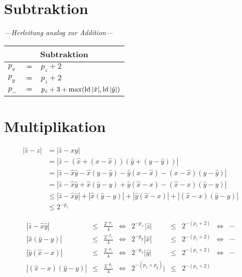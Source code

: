 \section{Subtraktion}

{\em ---Herleitung analog zur Addition---}

\begin{algorithm}
\phantom{}
\begin{center}
\renewcommand*{\arraystretch}{1.3}
\begin{tabular}{lcl}
  \hline
  \multicolumn{3}{c}{Subtraktion} \\
  \hline
   $p_x$ & $\defeq$ & $p_z+2$ \\
   $p_y$ & $\defeq$ & $p_z+2$ \\
   $p_-$ & $\defeq$ & $p_z+3+\max(\mathop{\rm ld}\nolimits|\hat{x}|,\mathop{\rm ld}\nolimits|\hat{y}|)$ \\
  \hline
\end{tabular}
\end{center}
\end{algorithm}



\pagebreak
\section{Multiplikation}

\begin{equation*}
\begin{split}
  |\hat{z}-z| & =  |\hat{z}-xy| \\
              & =  |\hat{z}-(\hat{x}+(x-\hat{x}))(\hat{y}+(y-\hat{y}))| \\
              & =  |\hat{z}-\hat{x}\hat{y}-\hat{x}(y-\hat{y})-\hat{y}(x-\hat{x})-(x-\hat{x})(y-\hat{y})| \\
              & =  |\hat{z}-\hat{x}\hat{y}+\hat{x}(\hat{y}-y)+\hat{y}(\hat{x}-x)-(\hat{x}-x)(\hat{y}-y)| \\
              &\le |\hat{z}-\hat{x}\hat{y}|+|\hat{x}(\hat{y}-y)|+|\hat{y}(\hat{x}-x)|+|(\hat{x}-x)(\hat{y}-y)| \\
              &\le 2^{-p_z}
\end{split}
\end{equation*}

\begin{equation*}
\begin{split}
  |\hat{z}-\hat{x}\hat{y}| & \le & \frac{2^{-p_z}}{4}
  & \Leftrightarrow & 
  2^{-{p_\times}}|\hat{z}| & \le & 2^{-(p_z+2)}
  & \Leftrightarrow & 
  \cdots
  \\
  |\hat{x}(\hat{y}-y)| & \le & \frac{2^{-p_z}}{4}
  & \Leftrightarrow & 
  2^{-p_y}|\hat{x}|  & \le & 2^{-(p_z+2)}
  & \Leftrightarrow & 
  \cdots
  \\
  |\hat{y}(\hat{x}-x)| & \le & \frac{2^{-p_z}}{4}
  & \Leftrightarrow & 
  2^{-p_x}|\hat{y}|  & \le & 2^{-(p_z+2)}
  & \Leftrightarrow & 
  \cdots
  \\
  |(\hat{x}-x)(\hat{y}-y)| & \le & \frac{2^{-p_z}}{4}
  & \Leftrightarrow & 
  2^{-(p_x+p_y)}|  & \le & 2^{-(p_z+2)}
  &  & 
  \\
\end{split}
\end{equation*}

